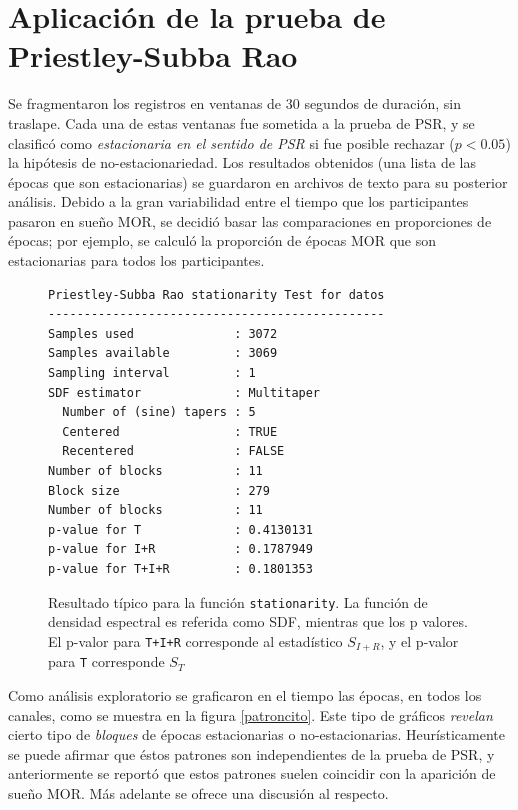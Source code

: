 
\section{Aplicación de la prueba de Priestley-Subba Rao}

Se fragmentaron los registros en ventanas de 30 segundos de duración, sin traslape. Cada una de 
estas ventanas fue sometida a la prueba de PSR, y se clasificó como \textit{estacionaria en el 
sentido de PSR} si fue posible rechazar ($p<0.05$) la hipótesis de no-estacionariedad. 
%
Los resultados obtenidos (una lista de las épocas que son estacionarias) se guardaron en archivos 
de texto para su posterior análisis. 
%
Debido a la gran variabilidad entre el tiempo que los participantes pasaron en sueño MOR, se decidió
basar las comparaciones en proporciones de épocas; por ejemplo, se calculó la proporción de
épocas MOR que son estacionarias para todos los participantes.

\begin{figure}
\centering
\begin{lstlisting}[caption={}]
Priestley-Subba Rao stationarity Test for datos
-----------------------------------------------
Samples used              : 3072 
Samples available         : 3069 
Sampling interval         : 1 
SDF estimator             : Multitaper 
  Number of (sine) tapers : 5 
  Centered                : TRUE 
  Recentered              : FALSE 
Number of blocks          : 11 
Block size                : 279 
Number of blocks          : 11 
p-value for T             : 0.4130131 
p-value for I+R           : 0.1787949 
p-value for T+I+R         : 0.1801353 
\end{lstlisting}
\caption[Resultado típico para la función \texttt{stationarity}]
{Resultado típico para la función \texttt{stationarity}. La función de densidad espectral es
referida como SDF, mientras que los p valores. El p-valor para \texttt{T+I+R} corresponde al 
estadístico $S_{I+R}$, y el p-valor para \texttt{T} corresponde $S_T$
}
\label{res_psr}
\end{figure}

Como análisis exploratorio se graficaron en el tiempo las épocas, en todos los canales, como se 
muestra en la figura \ref{patroncito}. Este tipo de gráficos \textit{revelan} cierto tipo de 
\textit{bloques} de épocas estacionarias o no-estacionarias. Heurísticamente se puede afirmar que 
éstos patrones son independientes de la prueba de PSR, y anteriormente se reportó que estos patrones
suelen coincidir con la aparición de sueño MOR. Más adelante se ofrece una discusión al 
respecto.

